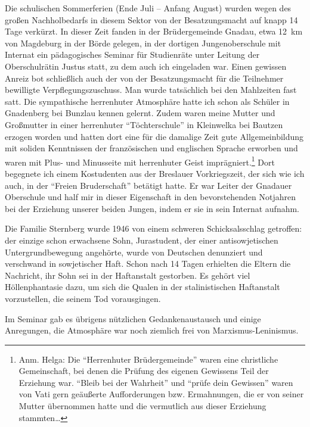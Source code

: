 Die schulischen Sommerferien (Ende Juli -- Anfang August) wurden wegen des großen Nachholbedarfs in diesem Sektor von der Besatzungsmacht auf knapp 14 Tage verkürzt. In dieser Zeit fanden in der Brüdergemeinde Gnadau, etwa  12~km von Magdeburg in der Börde gelegen, in der dortigen Jungenoberschule mit Internat ein pädagogisches Seminar für Studienräte unter Leitung der Oberschulrätin Justus statt, zu dem auch ich eingeladen war. Einen gewissen Anreiz bot schließlich auch der von der Besatzungsmacht für die Teilnehmer bewilligte Verpflegungszuschuss. Man wurde tatsächlich bei den Mahlzeiten fast satt. Die sympathische herrenhuter Atmosphäre hatte ich schon als Schüler in Gnadenberg bei Bunzlau kennen gelernt. Zudem waren meine Mutter und Großmutter in einer herrenhuter \enquote{Töchterschule} in Kleinwelka bei Bautzen erzogen worden und hatten dort eine für die damalige Zeit gute Allgemeinbildung mit soliden Kenntnissen der französischen und englischen Sprache erworben und waren mit Plus- und Minusseite mit herrenhuter Geist imprägniert.\footnote{Anm. Helga: Die \enquote{Herrenhuter Brüdergemeinde} waren eine christliche Gemeinschaft, bei denen die Prüfung des eigenen Gewissens Teil der Erziehung war. \enquote{Bleib bei der Wahrheit} und \enquote{prüfe dein Gewissen} waren von Vati gern geäußerte Aufforderungen bzw. Ermahnungen, die er von seiner Mutter übernommen hatte und die vermutlich aus dieser Erziehung stammten\dots} Dort begegnete ich einem Kostudenten aus der Breslauer Vorkriegszeit, der sich wie ich auch, in der \enquote{Freien Bruderschaft} betätigt hatte. Er war Leiter der Gnadauer Oberschule und half mir in dieser Eigenschaft in den bevorstehenden Notjahren bei der Erziehung unserer beiden Jungen, indem er sie in sein Internat aufnahm.

Die Familie Sternberg wurde 1946 von einem schweren Schicksalsschlag getroffen: der einzige schon erwachsene Sohn, Jurastudent, der einer antisowjetischen Untergrundbewegung angehörte, wurde von Deutschen denunziert und verschwand in sowjetischer Haft. Schon nach 14 Tagen erhielten die Eltern die Nachricht,  ihr Sohn sei in der Haftanstalt gestorben. Es gehört viel Höllenphantasie dazu, um sich die Qualen in der stalinistischen Haftanstalt vorzustellen, die seinem Tod vorausgingen.

Im Seminar gab es übrigens nützlichen Gedankenaustausch und einige Anregungen, die Atmosphäre war noch ziemlich frei von Marxismus-Leninismus.\\

